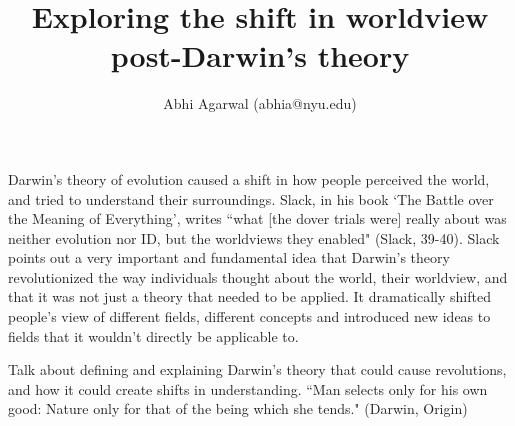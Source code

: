 \documentclass[11pt, oneside]{article}
\title{Exploring the shift in worldview post-Darwin's theory}
\author{Abhi Agarwal (abhia@nyu.edu)}
\date{}
\begin{document}
\maketitle



\par Darwin's theory of evolution caused a shift in how people perceived the world, and tried to understand their surroundings. Slack, in his book `The Battle over the Meaning of Everything', writes ``what [the dover trials were] really about was neither evolution nor ID, but the worldviews they enabled" (Slack, 39-40). Slack points out a very important and fundamental idea that Darwin's theory revolutionized the way individuals thought about the world, their worldview, and that it was not just a theory that needed to be applied. It dramatically shifted people's view of different fields, different concepts and introduced new ideas to fields that it wouldn't directly be applicable to.



\par Talk about defining and explaining Darwin's theory that could cause revolutions, and how it could create shifts in understanding.
``Man selects only for his own good: Nature only for that of the being which she tends." (Darwin, Origin)
\end{document}
